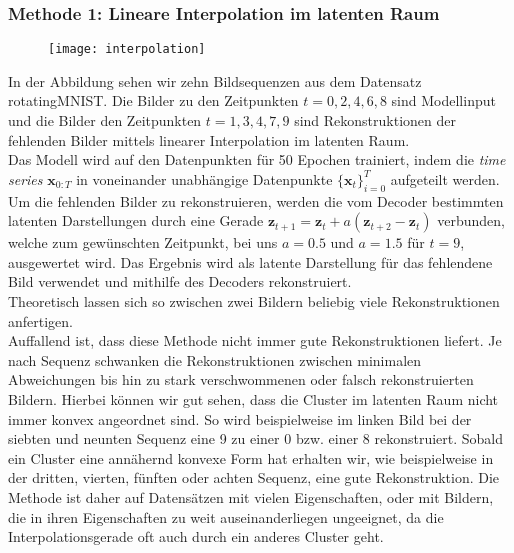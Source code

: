 \documentclass[12pt]{article}
\newcommand{\z}{\mathbf{z}}
\begin{document}
	\subsubsection{Methode 1: Lineare Interpolation im latenten Raum}
	\begin{figure}[h!]
		\begin{center}
		\texttt{[image: interpolation]}
		\end{center}
	\end{figure}
	In der Abbildung sehen wir zehn Bildsequenzen aus dem Datensatz rotatingMNIST. Die Bilder zu den Zeitpunkten $t=0,2,4,6,8$ sind Modellinput und die Bilder den Zeitpunkten $t=1,3,4,7,9$ sind Rekonstruktionen der fehlenden Bilder mittels linearer Interpolation im latenten Raum. \\
	Das Modell wird auf den Datenpunkten für 50 Epochen trainiert, indem die \emph{time series} $\mathbf{x}_{0:T}$ in voneinander unabhängige Datenpunkte $\{\mathbf{x}_t\}_{i=0}^T$ aufgeteilt werden.
	Um die fehlenden Bilder zu rekonstruieren, werden die vom Decoder bestimmten latenten Darstellungen durch eine Gerade $\z_{t+1} = \z_t + a(\z_{t+2}-\z_t)$ verbunden, welche zum gewünschten Zeitpunkt, bei uns $a = 0.5$ und $a = 1.5$ für $t=9$, ausgewertet wird. 
	Das Ergebnis wird als latente Darstellung für das fehlendene Bild verwendet und mithilfe des Decoders rekonstruiert. \\
	Theoretisch lassen sich so zwischen zwei Bildern beliebig viele Rekonstruktionen anfertigen.\\
	Auffallend ist, dass diese Methode nicht immer gute Rekonstruktionen liefert. 
	Je nach Sequenz schwanken die Rekonstruktionen zwischen minimalen Abweichungen bis hin zu stark verschwommenen oder falsch rekonstruierten Bildern. Hierbei können wir gut sehen, dass die Cluster im latenten Raum 
	nicht immer konvex angeordnet sind. So wird beispielweise im linken Bild bei der siebten und 
	neunten Sequenz eine 9 zu einer 0 bzw. einer 8 rekonstruiert. Sobald ein Cluster eine annähernd konvexe Form hat erhalten wir, wie beispielweise in der 
	dritten, vierten, fünften oder achten Sequenz, eine gute Rekonstruktion. Die Methode ist daher auf Datensätzen mit vielen Eigenschaften, oder mit Bildern, die in ihren Eigenschaften zu weit auseinanderliegen ungeeignet, da die Interpolationsgerade oft auch durch ein anderes Cluster geht.
	\\
\end{document}
